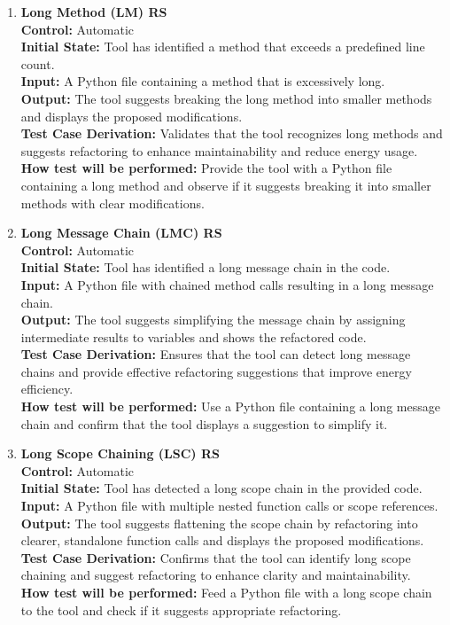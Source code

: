 \documentclass[12pt, titlepage]{article}
\begin{document}
\begin{enumerate}[label={\bf \textcolor{Maroon}{test-FR-RS-\arabic*}}, wide=0pt, font=\itshape]
  \item \textbf{Long Method (LM) RS}\\[2mm]
    \textbf{Control:} Automatic \\
    \textbf{Initial State:} Tool has identified a method that exceeds a predefined line count.\\
    \textbf{Input:} A Python file containing a method that is excessively long.\\
    \textbf{Output:} The tool suggests breaking the long method into smaller methods and displays the proposed modifications.\\[2mm]
    \textbf{Test Case Derivation:} Validates that the tool recognizes long methods and suggests refactoring to enhance maintainability and reduce energy usage.\\[2mm]
    \textbf{How test will be performed:} Provide the tool with a Python file containing a long method and observe if it suggests breaking it into smaller methods with clear modifications.
  
  \item \textbf{Long Message Chain (LMC) RS}\\[2mm]
    \textbf{Control:} Automatic \\
    \textbf{Initial State:} Tool has identified a long message chain in the code.\\
    \textbf{Input:} A Python file with chained method calls resulting in a long message chain.\\
    \textbf{Output:} The tool suggests simplifying the message chain by assigning intermediate results to variables and shows the refactored code.\\[2mm]
    \textbf{Test Case Derivation:} Ensures that the tool can detect long message chains and provide effective refactoring suggestions that improve energy efficiency.\\[2mm]
    \textbf{How test will be performed:} Use a Python file containing a long message chain and confirm that the tool displays a suggestion to simplify it.
  
  \item \textbf{Long Scope Chaining (LSC) RS}\\[2mm]
    \textbf{Control:} Automatic \\
    \textbf{Initial State:} Tool has detected a long scope chain in the provided code.\\
    \textbf{Input:} A Python file with multiple nested function calls or scope references.\\
    \textbf{Output:} The tool suggests flattening the scope chain by refactoring into clearer, standalone function calls and displays the proposed modifications.\\[2mm]
    \textbf{Test Case Derivation:} Confirms that the tool can identify long scope chaining and suggest refactoring to enhance clarity and maintainability.\\[2mm]
    \textbf{How test will be performed:} Feed a Python file with a long scope chain to the tool and check if it suggests appropriate refactoring.
  

\end{enumerate}
\end{document}
